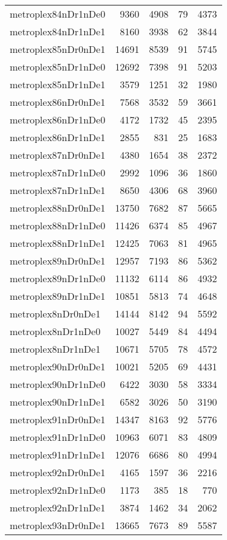 \begin{longtable}{lrrrr}
metroplex84nDr1nDe0 & 9360 & 4908 & 79 & 4373 \\
metroplex84nDr1nDe1 & 8160 & 3938 & 62 & 3844 \\
metroplex85nDr0nDe1 & 14691 & 8539 & 91 & 5745 \\
metroplex85nDr1nDe0 & 12692 & 7398 & 91 & 5203 \\
metroplex85nDr1nDe1 & 3579 & 1251 & 32 & 1980 \\
metroplex86nDr0nDe1 & 7568 & 3532 & 59 & 3661 \\
metroplex86nDr1nDe0 & 4172 & 1732 & 45 & 2395 \\
metroplex86nDr1nDe1 & 2855 & 831 & 25 & 1683 \\
metroplex87nDr0nDe1 & 4380 & 1654 & 38 & 2372 \\
metroplex87nDr1nDe0 & 2992 & 1096 & 36 & 1860 \\
metroplex87nDr1nDe1 & 8650 & 4306 & 68 & 3960 \\
metroplex88nDr0nDe1 & 13750 & 7682 & 87 & 5665 \\
metroplex88nDr1nDe0 & 11426 & 6374 & 85 & 4967 \\
metroplex88nDr1nDe1 & 12425 & 7063 & 81 & 4965 \\
metroplex89nDr0nDe1 & 12957 & 7193 & 86 & 5362 \\
metroplex89nDr1nDe0 & 11132 & 6114 & 86 & 4932 \\
metroplex89nDr1nDe1 & 10851 & 5813 & 74 & 4648 \\
metroplex8nDr0nDe1 & 14144 & 8142 & 94 & 5592 \\
metroplex8nDr1nDe0 & 10027 & 5449 & 84 & 4494 \\
metroplex8nDr1nDe1 & 10671 & 5705 & 78 & 4572 \\
metroplex90nDr0nDe1 & 10021 & 5205 & 69 & 4431 \\
metroplex90nDr1nDe0 & 6422 & 3030 & 58 & 3334 \\
metroplex90nDr1nDe1 & 6582 & 3026 & 50 & 3190 \\
metroplex91nDr0nDe1 & 14347 & 8163 & 92 & 5776 \\
metroplex91nDr1nDe0 & 10963 & 6071 & 83 & 4809 \\
metroplex91nDr1nDe1 & 12076 & 6686 & 80 & 4994 \\
metroplex92nDr0nDe1 & 4165 & 1597 & 36 & 2216 \\
metroplex92nDr1nDe0 & 1173 & 385 & 18 & 770 \\
metroplex92nDr1nDe1 & 3874 & 1462 & 34 & 2062 \\
metroplex93nDr0nDe1 & 13665 & 7673 & 89 & 5587 \\

\end{longtable}
